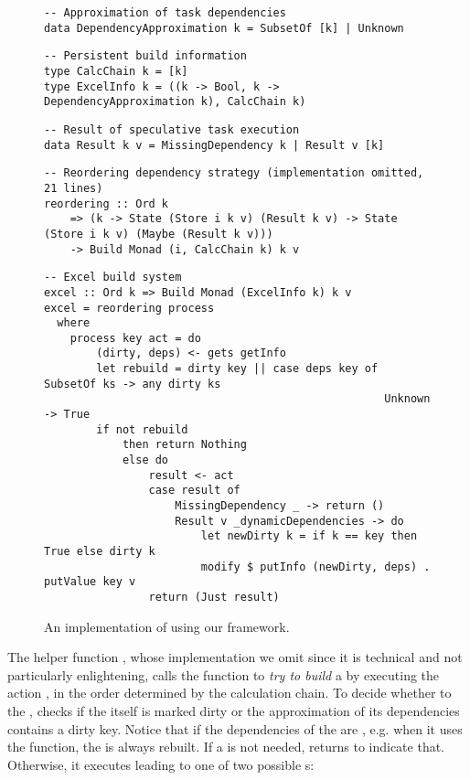 \begin{figure}
\begin{verbatim}
-- Approximation of task dependencies
data DependencyApproximation k = SubsetOf [k] | Unknown
\end{verbatim}
\vspace{1mm}
\begin{verbatim}
-- Persistent build information
type CalcChain k = [k]
type ExcelInfo k = ((k -> Bool, k -> DependencyApproximation k), CalcChain k)
\end{verbatim}
\vspace{1mm}
\begin{verbatim}
-- Result of speculative task execution
data Result k v = MissingDependency k | Result v [k]
\end{verbatim}
\vspace{1mm}
\begin{verbatim}
-- Reordering dependency strategy (implementation omitted, 21 lines)
reordering :: Ord k
    => (k -> State (Store i k v) (Result k v) -> State (Store i k v) (Maybe (Result k v)))
    -> Build Monad (i, CalcChain k) k v
\end{verbatim}
\vspace{1mm}
\begin{verbatim}
-- Excel build system
excel :: Ord k => Build Monad (ExcelInfo k) k v
excel = reordering process
  where
    process key act = do
        (dirty, deps) <- gets getInfo
        let rebuild = dirty key || case deps key of SubsetOf ks -> any dirty ks
                                                    Unknown     -> True
        if not rebuild
            then return Nothing
            else do
                result <- act
                case result of
                    MissingDependency _ -> return ()
                    Result v _dynamicDependencies -> do
                        let newDirty k = if k == key then True else dirty k
                        modify $ putInfo (newDirty, deps) . putValue key v
                return (Just result)
\end{verbatim}
\vspace{-2mm}
\caption{An implementation of \Excel using our framework.}\label{fig-excel-implementation}
\vspace{-2mm}
\end{figure}

The helper function , whose implementation we omit since it is
technical and not particularly enlightening, calls the function  to
\emph{try to build} a  by executing the action , in the order
determined by the calculation chain. To decide whether to  the
,  checks if the  itself is marked dirty or the
approximation of its dependencies contains a dirty key. Notice that if the
dependencies of the  are , e.g. when it uses the
 function, the  is always rebuilt. If a  is
not needed,  returns  to indicate that. Otherwise, it
executes  leading to one of two possible s:

